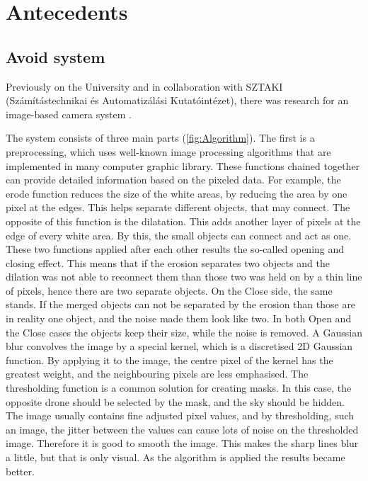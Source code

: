 \chapter{Antecedents} \label{ch:ant} %

\section{Avoid system} %
Previously on the University and in collaboration with SZTAKI (Számítástechnikai és Automatizálási Kutatóintézet), there was research for an image-based camera system  \cite{Zarandy2016}  \cite{Bauer2019} \cite{Zsedrovits2016a} \cite{Fuller2014HardwareDA}.

The system consists of three main parts (\cref{fig:Algorithm}).
The first is a preprocessing, which uses well-known image processing algorithms that are implemented in many computer graphic library.
These functions chained together can provide detailed information based on the pixeled data.
For example, the erode function reduces the size of the white areas, by reducing the area by one pixel at the edges.
This helps separate different objects, that may connect.
The opposite of this function is the dilatation.
This adds another layer of pixels at the edge of every white area.
By this, the small objects can connect and act as one.
These two functions applied after each other results the so-called opening and closing effect.
This means that if the erosion separates two objects and the dilation was not able to reconnect them than those two was held on by a thin line of pixels, hence there are two separate objects.
On the Close side, the same stands.
If the merged objects can not be separated by the erosion than those are in reality one object, and the noise made them look like two.
In both Open and the Close cases the objects keep their size, while the noise is removed.
A Gaussian blur convolves the image by a special kernel, which is a discretised 2D Gaussian function.
By applying it to the image, the centre pixel of the kernel has the greatest weight, and the neighbouring pixels are less emphasised.
The thresholding function is a common solution for creating masks.
In this case, the opposite drone should be selected by the mask, and the sky should be hidden.
The image usually contains fine adjusted pixel values, and by thresholding, such an image, the jitter between the values can cause lots of noise on the thresholded image.
Therefore it is good to smooth the image.
This makes the sharp lines blur a little, but that is only visual.
As the algorithm is applied the results became better.


